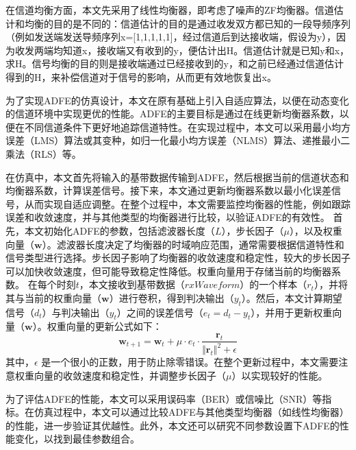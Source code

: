\documentclass[UTF8,a4paper,12pt]{ctexart}
\numberwithin{equation}{section}
\begin{document}
	在信道均衡方面，本文先采用了线性均衡器，即考虑了噪声的ZF均衡器。信道估计和均衡的目的是不同的：信道估计的目的是通过收发双方都已知的一段导频序列（例如发送端发送导频序列x=[1,1,1,1,1]，经过信道后到达接收端，假设为y），因为收发两端均知道x，接收端又有收到的y，便估计出H。信道估计就是已知y和x，求H。信号均衡的目的则是接收端通过已经接收到的y，和之前已经通过信道估计得到的H，来补偿信道对于信号的影响，从而更有效地恢复出x。
	
	为了实现ADFE的仿真设计，本文在原有基础上引入自适应算法，以便在动态变化的信道环境中实现更优的性能。ADFE的主要目标是通过在线更新均衡器系数，以便在不同信道条件下更好地追踪信道特性。在实现过程中，本文可以采用最小均方误差（LMS）算法或其变种，如归一化最小均方误差（NLMS）算法、递推最小二乘法（RLS）等。
	
	在仿真中，本文首先将输入的基带数据传输到ADFE，然后根据当前的信道状态和均衡器系数，计算误差信号。接下来，本文通过更新均衡器系数以最小化误差信号，从而实现自适应调整。在整个过程中，本文需要监控均衡器的性能，例如跟踪误差和收敛速度，并与其他类型的均衡器进行比较，以验证ADFE的有效性。
	首先，本文初始化ADFE的参数，包括滤波器长度（$L$），步长因子（$\mu$），以及权重向量（$\boldsymbol{w}$）。滤波器长度决定了均衡器的时域响应范围，通常需要根据信道特性和信号类型进行选择。步长因子影响了均衡器的收敛速度和稳定性，较大的步长因子可以加快收敛速度，但可能导致稳定性降低。权重向量用于存储当前的均衡器系数。
	在每个时刻$t$，本文接收到基带数据（$\textit{rxWaveform}$）的一个样本（$r_t$），并将其与当前的权重向量（$\boldsymbol{w}$）进行卷积，得到判决输出（$y_t$）。然后，本文计算期望信号（$d_t$）与判决输出（$y_t$）之间的误差信号（$e_t = d_t - y_t$），并用于更新权重向量（$\boldsymbol{w}$）。权重向量的更新公式如下：
	\begin{equation}
		\boldsymbol{w}_{t+1} = \boldsymbol{w}_t + \mu \cdot e_t \cdot \frac{\boldsymbol{r}_t}{\Vert \boldsymbol{r}_t \Vert^2 + \epsilon}
	\end{equation}
	其中，$\epsilon$ 是一个很小的正数，用于防止除零错误。在整个更新过程中，本文需要注意权重向量的收敛速度和稳定性，并调整步长因子（$\mu$）以实现较好的性能。
	
	为了评估ADFE的性能，本文可以采用误码率（BER）或信噪比（SNR）等指标。在仿真过程中，本文可以通过比较ADFE与其他类型均衡器（如线性均衡器）的性能，进一步验证其优越性。此外，本文还可以研究不同参数设置下ADFE的性能变化，以找到最佳参数组合。
	
\end{document}
